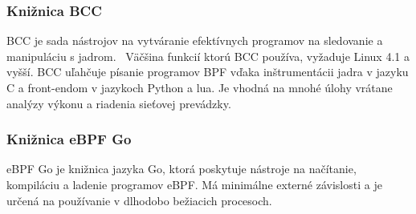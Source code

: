\subsubsection{Knižnica BCC}
BCC je sada nástrojov na vytváranie efektívnych programov na sledovanie a manipuláciu s jadrom.~\cite{bcc}  Väčšina funkcií ktorú BCC používa, vyžaduje Linux 4.1 a vyšší. 
BCC uľahčuje písanie programov BPF vďaka inštrumentácii jadra v jazyku C a front-endom v jazykoch Python a lua. Je vhodná na mnohé úlohy vrátane analýzy výkonu a 
riadenia sieťovej prevádzky.

\subsubsection{Knižnica eBPF Go}
eBPF Go je knižnica jazyka Go, ktorá poskytuje nástroje na načítanie, kompiláciu a ladenie programov eBPF. Má minimálne externé závislosti 
a je určená na používanie v dlhodobo bežiacich procesoch. 

